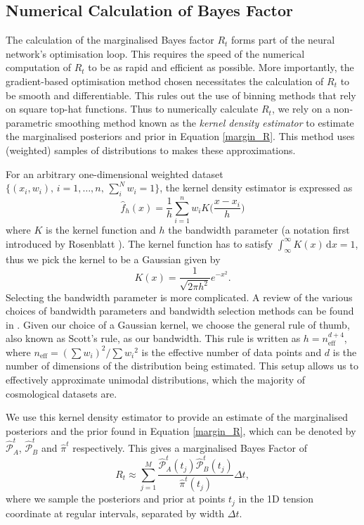 \documentclass[%
 reprint,
 amsmath,amssymb,
 aps,
]{revtex4-2}
\begin{document}
\subsection{Numerical Calculation of Bayes Factor}

The calculation of the marginalised Bayes factor $R_t$ forms part of the neural network's optimisation loop. This requires the speed of the numerical computation of $R_t$ to be as rapid and efficient as possible. More importantly, the gradient-based optimisation method chosen necessitates the calculation of $R_t$ to be smooth and differentiable. This rules out the use of binning methods that rely on square top-hat functions. Thus to numerically calculate $R_t$, we rely on a non-parametric smoothing method known as the \textit{kernel density estimator} \cite{Rosenblatt1956, Silverman1986} to estimate the marginalised posteriors and prior in Equation \ref{margin_R}. This method uses (weighted) samples of distributions to makes these approximations.

For an arbitrary one-dimensional weighted dataset $\{(x_{i}, w_{i}), \, i = 1, \dots , n, \, \sum_i^N w_{i} = 1\}$, the kernel density estimator is expressed as
\begin{equation}
    \hat{f}_h (x) = \frac{1}{h} \sum_{i = 1}^{n} w_{i} K \bigg( \frac{x - x_{i}}{h} \bigg)
\end{equation}
where $K$ is the kernel function and $h$ the bandwidth parameter (a notation first introduced by Rosenblatt \cite{Rosenblatt1956}). The kernel function has to satisfy $\int_{\infty}^{\infty} K(x) \, \textrm{d} x = 1$, thus we pick the kernel to be a Gaussian given by
\begin{equation}
    K(x) = \frac{1}{\sqrt{2\pi h^2}} e^{-x^2}.
\end{equation}
Selecting the bandwidth parameter is more complicated. A review of the various choices of bandwidth parameters and bandwidth selection methods can be found in \cite{Turlach1993}. Given our choice of a Gaussian kernel, we choose the general rule of thumb, also known as Scott's rule, as our bandwidth. This rule is written as $h = n_{\textrm{eff}}^{d + 4}$, where $n_{\textrm{eff}} = (\sum w_{i})^2 / {\sum {w_{i}}^2}$ is the effective number of data points and $d$ is the number of dimensions of the distribution being estimated. This setup allows us to effectively approximate unimodal distributions, which the majority of cosmological datasets are.

We use this kernel density estimator to provide an estimate of the marginalised posteriors and the prior found in Equation \ref{margin_R}, which can be denoted by $\hat{\mathcal{P}}_A^{t}$, $\hat{\mathcal{P}}_B^{t}$ and $\hat{\pi}^{t}$ respectively. This gives a marginalised Bayes Factor of
\begin{equation}
    R_t \approx \sum_{j = 1}^{M} \frac{\hat{\mathcal{P}}_A^{t}(t_j) \hat{\mathcal{P}}_B^{t}(t_j)}{\hat{\pi}^{t}(t_j)} \Delta t,
\end{equation}
where we sample the posteriors and prior at points $t_j$ in the 1D tension coordinate at regular intervals, separated by width $\Delta t$.
\end{document}
